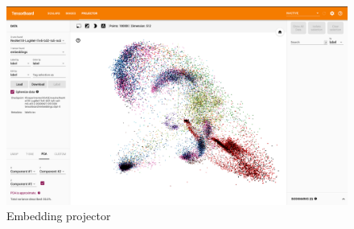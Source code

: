 \begin{figure}[htbp]
	\centering
	\includegraphics[width=0.85\linewidth]{img/Embedding_Projector_Tensorboard.png}
	\caption{Embedding projector}
	\label{fig:Embedding-Projector}
\end{figure}